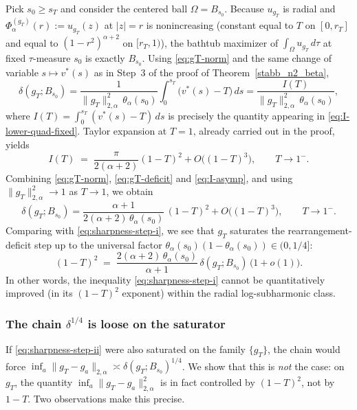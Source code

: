 \documentclass[a4paper,10pt]{amsart}
\begin{document}
Pick $s_0\ge s_T$ and consider the centered ball $\Omega=B_{s_0}$. Because
$u_{g_T}$ is radial and $\Phi^{(g_T)}_\alpha(r):=u_{g_T}(z)$ at $|z|=r$ is
nonincreasing (constant equal to $T$ on $[0,r_T]$ and equal to
$(1-r^2)^{\alpha+2}$ on $[r_T,1)$), the bathtub maximizer of
$\int_\Omega u_{g_T}\,d\tau$ at fixed $\tau$-measure $s_0$ is exactly
$B_{s_0}$. Using \eqref{eq:gT-norm} and the same change of variable
$s\mapsto v^*(s)$ as in Step~3 of the proof of
Theorem~\ref{stabb_n2_beta},
\begin{equation}\label{eq:gT-deficit}
\delta(g_T;B_{s_0})
=
\frac{1}{\|g_T\|_{2,\alpha}^2\,\theta_\alpha(s_0)}
\int_0^{s_T}\bigl(v^*(s)-T\bigr)\,ds
=
\frac{I(T)}{\|g_T\|_{2,\alpha}^2\,\theta_\alpha(s_0)},
\end{equation}
where $I(T)=\int_0^{s_T}(v^*(s)-T)\,ds$ is precisely the quantity
appearing in \eqref{eq:I-lower-quad-fixed}. Taylor expansion at $T=1$,
already carried out in the proof, yields
\begin{equation}\label{eq:I-asymp}
I(T)\;=\;\frac{\pi}{2(\alpha+2)}(1-T)^2+O\bigl((1-T)^3\bigr),\qquad T\to 1^-.
\end{equation}
Combining \eqref{eq:gT-norm}, \eqref{eq:gT-deficit} and \eqref{eq:I-asymp},
and using $\|g_T\|_{2,\alpha}^2\to 1$ as $T\to 1$, we obtain
\begin{equation}\label{eq:gT-deficit-asymp}
\delta(g_T;B_{s_0})
=
\frac{\alpha+1}{2(\alpha+2)\,\theta_\alpha(s_0)}\,(1-T)^2
+O\bigl((1-T)^3\bigr),\qquad T\to 1^-.
\end{equation}
Comparing with \eqref{eq:sharpness-step-i}, we see that $g_T$ saturates the
rearrangement-deficit step up to the universal factor
$\theta_\alpha(s_0)(1-\theta_\alpha(s_0))\in(0,1/4]$:
\[
(1-T)^2
\;=\;
\frac{2(\alpha+2)\,\theta_\alpha(s_0)}{\alpha+1}\,
\delta(g_T;B_{s_0})\,\bigl(1+o(1)\bigr).
\]
In other words, the inequality \eqref{eq:sharpness-step-i} cannot be
quantitatively improved (in its $(1-T)^2$ exponent) within the radial
log-subharmonic class.

\subsubsection*{The chain $\delta^{1/4}$ is loose on the saturator}

If \eqref{eq:sharpness-step-ii} were also saturated on the family $\{g_T\}$,
the chain would force $\inf_a\|g_T-g_a\|_{2,\alpha}\asymp\delta(g_T;B_{s_0})^{1/4}$. We show that this is \emph{not} the case: on $g_T$, the quantity
$\inf_a\|g_T-g_a\|_{2,\alpha}^2$ is in fact controlled by $(1-T)^2$, not by
$1-T$. Two observations make this precise.
\end{document}
